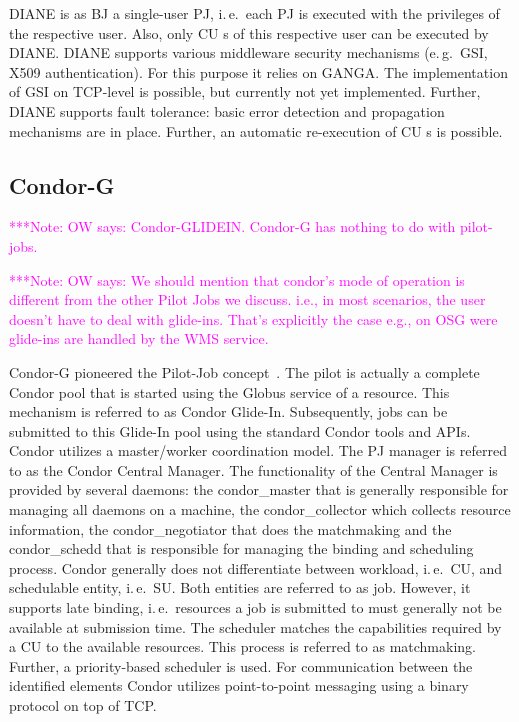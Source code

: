\documentclass[conference,final]{IEEEtran}
\newcommand{\note}[1]{ {\textcolor{magenta} { ***Note: #1 }}}
\newcommand{\note}[1]{}
\newcommand{\cu}{CU\xspace}
\newcommand{\upp}{\vspace*{-0.5em}}
\begin{document}
DIANE is as BJ a single-user PJ, i.\,e.\ each PJ is executed with the
privileges of the respective user. Also, only \cu s of this respective user can be
executed by DIANE. DIANE supports various middleware security mechanisms
(e.\,g.\ GSI, X509 authentication). For this purpose it relies on GANGA. The
implementation of GSI on TCP-level is possible, but currently not yet
implemented. Further, DIANE supports fault tolerance: basic error detection and
propagation mechanisms are in place. Further, an automatic re-execution of \cu s
is possible.

\upp
\subsection{Condor-G\upp\upp}

\note{OW says: Condor-GLIDEIN. Condor-G has nothing to do with
pilot-jobs.}

\note{OW says: We should mention that condor's mode of operation
is different from the other Pilot Jobs we discuss. i.e., in most
scenarios, the user doesn't have to deal with glide-ins. That's 
explicitly the case e.g., on OSG were glide-ins are handled by
the WMS service.}

Condor-G pioneered the Pilot-Job concept~\cite{condor-g}. The pilot is
actually a complete Condor pool that is started using the Globus
service of a resource. This mechanism is referred to as Condor
Glide-In. Subsequently, jobs can be submitted to this Glide-In pool
using the standard Condor tools and APIs. Condor utilizes a
master/worker coordination model. The PJ manager is referred to as the
Condor Central Manager. The functionality of the Central Manager is
provided by several daemons: the condor\_master that is generally
responsible for managing all daemons on a machine, the
condor\_collector which collects resource information, the
condor\_negotiator that does the matchmaking and the condor\_schedd
that is responsible for managing the binding and scheduling
process. Condor generally does not differentiate between workload,
i.\,e.\ \cu, and schedulable entity, i.\,e.\ SU. Both entities are
referred to as job. However, it supports late binding, i.\,e.\
resources a job is submitted to must generally not be available at
submission time. The scheduler matches the capabilities required by a
\cu to the available resources. This process is referred to as
matchmaking. Further, a priority-based scheduler is used. For
communication between the identified elements Condor utilizes
point-to-point messaging using a binary protocol on top of TCP.
\end{document}
